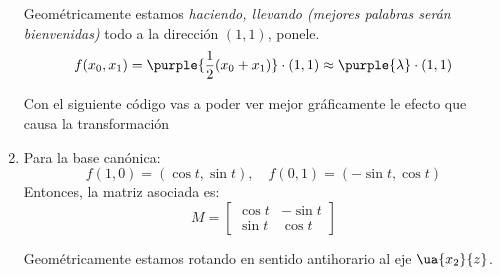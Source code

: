 \begin{enumerate}[label=(\alph*)]
        Geométricamente estamos \textit{haciendo, llevando {\tiny (mejores palabras serán bienvenidas)}} todo a la dirección $(1,1)$, ponele.
        $$
          f(x_0,x_1) = \purple{\frac{1}{2}(x_0 + x_1)} \cdot (1,1) \approx \purple{\lambda} \cdot (1,1)
        $$

        Con el siguiente código vas a poder ver mejor gráficamente le efecto que causa la transformación
        \copyPaste

  \item Para la base canónica:
        $$
          f(1,0) = (\cos t, \sin t), \quad f(0,1) = (-\sin t, \cos t)
        $$
        Entonces, la matriz asociada es:
        $$
          M =
          \begin{bmatrix}
            \cos t & -\sin t \\
            \sin t & \cos t
          \end{bmatrix}
        $$
        \begin{minipage}{0.65\textwidth}
          Geométricamente estamos rotando en sentido antihorario al eje $\ua{x_2}{z}$.
        \end{minipage}
        \begin{minipage}{0.35\textwidth}
        \end{minipage}
\end{enumerate}

\begin{aportes}
  \item {}
  \item {}
\end{aportes}
